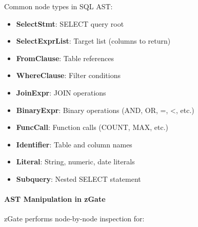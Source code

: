 Common node types in SQL AST:

\begin{itemize}
    \item \textbf{SelectStmt}: SELECT query root
    \item \textbf{SelectExprList}: Target list (columns to return)
    \item \textbf{FromClause}: Table references
    \item \textbf{WhereClause}: Filter conditions
    \item \textbf{JoinExpr}: JOIN operations
    \item \textbf{BinaryExpr}: Binary operations (AND, OR, =, <, etc.)
    \item \textbf{FuncCall}: Function calls (COUNT, MAX, etc.)
    \item \textbf{Identifier}: Table and column names
    \item \textbf{Literal}: String, numeric, date literals
    \item \textbf{Subquery}: Nested SELECT statement
\end{itemize}

\paragraph{AST Manipulation in zGate}

zGate performs node-by-node inspection for:

